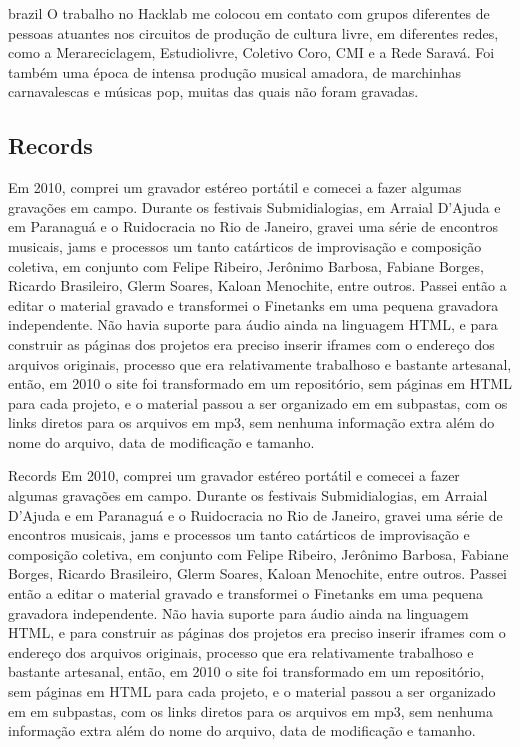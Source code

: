 \begin{otherlanguage*}{brazil}
O trabalho no Hacklab me colocou em contato com grupos diferentes de pessoas atuantes nos circuitos de produção de cultura livre, em diferentes redes, como a Merareciclagem, Estudiolivre, Coletivo Coro, CMI e a Rede Saravá. Foi também uma época de intensa produção musical amadora, de marchinhas carnavalescas e músicas pop, muitas das quais não foram gravadas. 


\subsection{Records}
Em 2010, comprei um gravador estéreo portátil e comecei a fazer algumas gravações em campo. Durante os festivais Submidialogias, em Arraial D'Ajuda e em Paranaguá e o Ruidocracia no Rio de Janeiro, gravei uma série de encontros musicais, jams e processos um tanto catárticos de improvisação e composição coletiva, em conjunto com Felipe Ribeiro, Jerônimo Barbosa, Fabiane Borges, Ricardo Brasileiro, Glerm Soares, Kaloan Menochite, entre outros. Passei então a editar o material gravado e transformei o Finetanks em uma pequena gravadora independente. Não havia suporte para áudio ainda na linguagem HTML, e para construir as páginas dos projetos era preciso inserir iframes com o endereço dos arquivos originais, processo que era relativamente trabalhoso e bastante artesanal, então, em 2010 o site foi transformado em um repositório, sem páginas em HTML para cada projeto, e o material passou a ser organizado em em subpastas, com os links diretos para os arquivos em mp3, sem nenhuma informação extra além do nome do arquivo, data de modificação e tamanho. 

Records
Em 2010, comprei um gravador estéreo portátil e comecei a fazer algumas gravações em campo. Durante os festivais Submidialogias, em Arraial D'Ajuda e em Paranaguá e o Ruidocracia no Rio de Janeiro, gravei uma série de encontros musicais, jams e processos um tanto catárticos de improvisação e composição coletiva, em conjunto com Felipe Ribeiro, Jerônimo Barbosa, Fabiane Borges, Ricardo Brasileiro, Glerm Soares, Kaloan Menochite, entre outros. Passei então a editar o material gravado e transformei o Finetanks em uma pequena gravadora independente. Não havia suporte para áudio ainda na linguagem HTML, e para construir as páginas dos projetos era preciso inserir iframes com o endereço dos arquivos originais, processo que era relativamente trabalhoso e bastante artesanal, então, em 2010 o site foi transformado em um repositório, sem páginas em HTML para cada projeto, e o material passou a ser organizado em em subpastas, com os links diretos para os arquivos em mp3, sem nenhuma informação extra além do nome do arquivo, data de modificação e tamanho. 


\end{otherlanguage*}

